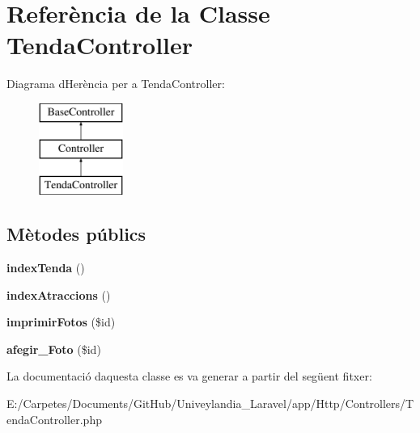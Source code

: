 \hypertarget{class_app_1_1_http_1_1_controllers_1_1_tenda_controller}{}\section{Referència de la Classe Tenda\+Controller}
\label{class_app_1_1_http_1_1_controllers_1_1_tenda_controller}
Diagrama d\textquotesingle{}Herència per a Tenda\+Controller\+:\begin{figure}[H]
\begin{center}
\leavevmode
\includegraphics[height=3.000000cm]{class_app_1_1_http_1_1_controllers_1_1_tenda_controller}
\end{center}
\end{figure}
\subsection*{Mètodes públics}
\begin{DoxyCompactItemize}
\item 
\mbox{\label{class_app_1_1_http_1_1_controllers_1_1_tenda_controller_a2a799a9c459991c4b1ac8d632c4f5f68}} 
{\bfseries index\+Tenda} ()
\item 
\mbox{\label{class_app_1_1_http_1_1_controllers_1_1_tenda_controller_a529fc240ab42ddac1f823972e2b72b8f}} 
{\bfseries index\+Atraccions} ()
\item 
\mbox{\label{class_app_1_1_http_1_1_controllers_1_1_tenda_controller_a6b4885d7de5c83c56246fe83593a4dbc}} 
{\bfseries imprimir\+Fotos} (\$id)
\item 
\mbox{\label{class_app_1_1_http_1_1_controllers_1_1_tenda_controller_ab7cc52310e74d3ffbc48d743558eaaa3}} 
{\bfseries afegir\+\_\+\+Foto} (\$id)
\end{DoxyCompactItemize}


La documentació d\textquotesingle{}aquesta classe es va generar a partir del següent fitxer\+:\begin{DoxyCompactItemize}
\item 
E\+:/\+Carpetes/\+Documents/\+Git\+Hub/\+Univeylandia\+\_\+\+Laravel/app/\+Http/\+Controllers/Tenda\+Controller.\+php\end{DoxyCompactItemize}
